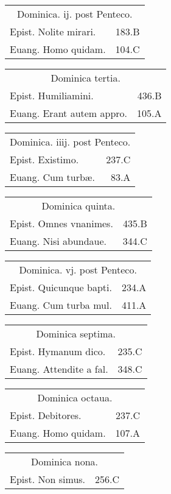 \documentclass[a5paper,10pt]{book}
\def\ae{æ}
\begin{document}
\begin{multicols}{2}
\begin{tabular}{l r}
\multicolumn{2}{c}{\color{red} Dominica. ij. post Penteco.}\\
Epist. Nolite mirari. & 183.B\\
Euang. Homo quidam. & 104.C\\
\end{tabular}
\begin{tabular}{l r}
\multicolumn{2}{c}{\color{red} Dominica tertia.}\\
Epist. Humiliamini. & 436.B\\
Euang. Erant autem appro. & 105.A\\
\end{tabular}
\begin{tabular}{l r}
\multicolumn{2}{c}{\color{red} Dominica. iiij. post Penteco.}\\
Epist. Existimo. & 237.C\\
Euang. Cum turb\ae . & 83.A\\%
\end{tabular}
\begin{tabular}{l r}
\multicolumn{2}{c}{\color{red} Dominica quinta.}\\
Epist. Omnes vnanimes. & 435.B\\
Euang. Nisi abundaue. & 344.C\\
\end{tabular}
\begin{tabular}{l r}
\multicolumn{2}{c}{\color{red} Dominica. vj. post Penteco.}\\
Epist. Quicunque bapti. & 234.A\\
Euang. Cum turba mul. & 411.A\\
\end{tabular}
\begin{tabular}{l r}
\multicolumn{2}{c}{\color{red} Dominica septima.}\\
Epist. Hymanum dico. & 235.C\\
Euang. Attendite a fal. & 348.C\\
\end{tabular}
\begin{tabular}{l r}
\multicolumn{2}{c}{\color{red} Dominica octaua.}\\
Epist. Debitores. & 237.C\\
Euang. Homo quidam. & 107.A\\
\end{tabular}
\begin{tabular}{l r}
\multicolumn{2}{c}{\color{red} Dominica nona.}\\
Epist. Non simus. & 256.C\\

\end{tabular}
\end{multicols}
\end{document}
